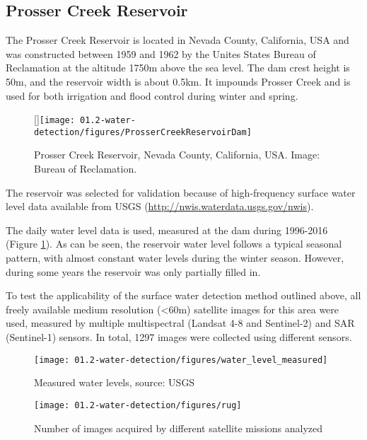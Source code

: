 \subsection{Prosser Creek Reservoir}

The Prosser Creek Reservoir is located in Nevada County, California, USA and was constructed between 1959 and 1962 by the Unites States Bureau of Reclamation at the altitude 1750m above the sea level. The dam crest height is 50m, and the reservoir width is about 0.5km. It impounds Prosser Creek and is used for both irrigation and flood control during winter and spring. 

\begin{wrapfigure}{r}{0pt}
	\raisebox{0pt}[\dimexpr{}\baselineskip\relax]{\texttt{[image: 01.2-water-detection/figures/ProsserCreekReservoirDam]}}
	\caption{Prosser Creek Reservoir, Nevada County, California, USA. Image: Bureau of Reclamation.}
\end{wrapfigure}

The reservoir was selected for validation because of high-frequency surface water level data available from USGS (\url{http://nwis.waterdata.usgs.gov/nwis}). 

The daily water level data is used, measured at the dam during 1996-2016 (Figure \ref{fig:pc-water-levels}). As can be seen, the reservoir water level follows a typical seasonal pattern, with almost constant water levels during the winter season. However, during some years the reservoir was only partially filled in.

To test the applicability of the surface water detection method outlined above, all freely available medium resolution (<60m) satellite images for this area were used, measured by multiple multispectral (Landsat 4-8 and Sentinel-2) and SAR (Sentinel-1) sensors. In total, 1297 images were collected using different sensors.

\begin{figure}[H]
	\centering
	\texttt{[image: 01.2-water-detection/figures/water\_level\_measured]}
	\caption{Measured water levels, source: USGS}
	\label{fig:pc-water-levels}
\end{figure}

\begin{figure}[H]
	\centering
	\texttt{[image: 01.2-water-detection/figures/rug]}
	\caption{Number of images acquired by different satellite missions analyzed}
	\label{fig:pc-n-images}
\end{figure}

